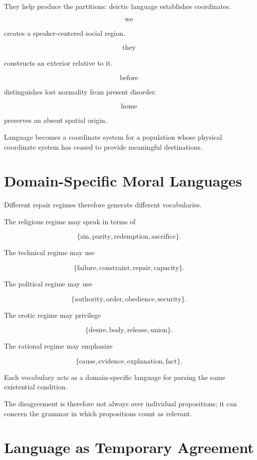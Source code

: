 \documentclass[11pt,oneside]{book}
\theoremstyle{definition}
\theoremstyle{remark}
\begin{document}
They help produce the partitions: deictic language establishes coordinates.

\[
\text{we}
\]

creates a speaker-centered social region.

\[
\text{they}
\]

constructs an exterior relative to it.

\[
\text{before}
\]

distinguishes lost normality from present disorder.

\[
\text{home}
\]

preserves an absent spatial origin.

Language becomes a coordinate system for a population whose physical coordinate system has ceased to provide meaningful destinations.

\section{Domain-Specific Moral Languages}

Different repair regimes therefore generate different vocabularies.

The religious regime may speak in terms of

\[
\{\text{sin},\text{purity},\text{redemption},\text{sacrifice}\}.
\]

The technical regime may use

\[
\{\text{failure},\text{constraint},\text{repair},\text{capacity}\}.
\]

The political regime may use

\[
\{\text{authority},\text{order},\text{obedience},\text{security}\}.
\]

The erotic regime may privilege

\[
\{\text{desire},\text{body},\text{release},\text{union}\}.
\]

The rational regime may emphasize

\[
\{\text{cause},\text{evidence},\text{explanation},\text{fact}\}.
\]

Each vocabulary acts as a domain-specific language for parsing the same existential condition.

The disagreement is therefore not always over individual propositions; it can concern the grammar in which propositions count as relevant.

\section{Language as Temporary Agreement}
\end{document}
